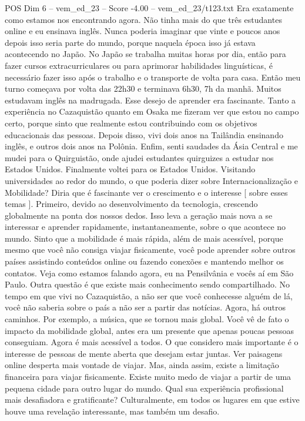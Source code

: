 \begin{textsample}{POS Dim 6 – vem\_ed\_23 – Score -4.00 – vem\_ed\_23/t123.txt}
Era exatamente como estamos nos encontrando agora.
Não tinha mais do que três estudantes online e eu ensinava inglês.
Nunca poderia imaginar que vinte e poucos anos depois isso seria parte do mundo, porque naquela época isso já estava acontecendo no Japão.
No Japão se trabalha muitas horas por dia, então para fazer cursos extracurriculares ou para aprimorar habilidades linguísticas, é necessário fazer isso após o trabalho e o transporte de volta para casa.
Então meu turno começava por volta das 22h30 e terminava 6h30, 7h da manhã.
Muitos estudavam inglês na madrugada.
Esse desejo de aprender era fascinante.
Tanto a experiência no Cazaquistão quanto em Osaka me fizeram ver que estou no campo certo, porque sinto que realmente estou contribuindo com os objetivos educacionais das pessoas.
Depois disso, vivi dois anos na Tailândia ensinando inglês, e outros dois anos na Polônia.
Enfim, senti saudades da Ásia Central e me mudei para o Quirguistão, onde ajudei estudantes quirguizes a estudar nos Estados Unidos.
Finalmente voltei para os Estados Unidos.
Visitando universidades ao redor do mundo, o que poderia dizer sobre Internacionalização e Mobilidade?
Diria que é fascinante ver o crescimento e o interesse [ sobre esses temas ].
Primeiro, devido ao desenvolvimento da tecnologia, crescendo globalmente na ponta dos nossos dedos.
Isso leva a geração mais nova a se interessar e aprender rapidamente, instantaneamente, sobre o que acontece no mundo.
Sinto que a mobilidade é mais rápida, além de mais acessível, porque mesmo que você não consiga viajar fisicamente, você pode aprender sobre outros países assistindo conteúdos online ou fazendo conexões e mantendo melhor os contatos.
Veja como estamos falando agora, eu na Pensilvânia e vocês aí em São Paulo.
Outra questão é que existe mais conhecimento sendo compartilhado.
No tempo em que vivi no Cazaquistão, a não ser que você conhecesse alguém de lá, você não saberia sobre o país a não ser a partir das notícias.
Agora, há outros caminhos.
Por exemplo, a música, que se tornou mais global.
Você vê de fato o impacto da mobilidade global, antes era um presente que apenas poucas pessoas conseguiam.
Agora é mais acessível a todos.
O que considero mais importante é o interesse de pessoas de mente aberta que desejam estar juntas.
Ver paisagens online desperta mais vontade de viajar.
Mas, ainda assim, existe a limitação financeira para viajar fisicamente.
Existe muito medo de viajar a partir de uma pequena cidade para outro lugar do mundo.
Qual sua experiência profissional mais desafiadora e gratificante?
Culturalmente, em todos os lugares em que estive houve uma revelação interessante, mas também um desafio.

\end{textsample}
